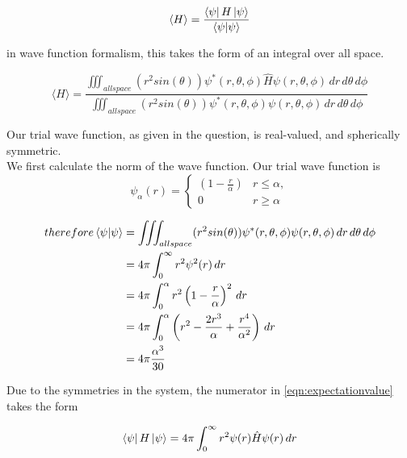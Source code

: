     \begin{equation*}
        \langle H \rangle = \frac{\bra{\psi}H\ket{\psi}}{\braket{\psi}{\psi}}
    \end{equation*}

    in wave function formalism, this takes the form of an integral over all
    space.

    \begin{equation}
        \label{eqn:expectationvalue}
        \langle H \rangle = \frac{\iiint_{all space} (r^{2}sin(\theta))\psi^{*}(r,\theta,\phi)\hat{H}\psi(r,\theta,\phi) \,dr\,d\theta\,d\phi}{\iiint_{all space} (r^{2}sin(\theta))\psi^{*}(r,\theta,\phi)\psi(r,\theta,\phi) \,dr\,d\theta\,d\phi}
    \end{equation}

    Our trial wave function, as given in the question, is real-valued, and
    spherically symmetric. \\
    We first calculate the norm of the wave function. Our trial wave function is
    \begin{equation*}
        \psi_{\alpha}(r) = 
        \begin{cases}
            \left( 1 - \frac{r}{\alpha}\right) & r \leqslant \alpha, \\
            0 & r \geqslant \alpha 
        \end{cases}
    \end{equation*}

    \begin{equation*}
    \begin{split}
        therefore \braket{\psi}{\psi} & = \iiint_{all space} (r^{2}sin(\theta))\psi^{*}(r,\theta,\phi)\psi(r,\theta,\phi) \,dr\,d\theta\,d\phi \\
        & = 4\pi \int_{0}^{\infty} r^{2} \psi^{2}(r)\,dr \\
        & = 4\pi \int_{0}^{\alpha} r^{2}\left( 1 - \frac{r}{\alpha}\right)^{2}\,dr \\
        & = 4\pi \int_{0}^{\alpha} \left( r^2 - \frac{2r^3}{\alpha} + \frac{r^4}{\alpha^2} \right)\,dr \\
        & = 4\pi \frac{\alpha^3}{30}
    \end{split}
    \end{equation*}
    
    Due to the symmetries in the system, the numerator in
    \ref{eqn:expectationvalue} takes the form

    \begin{equation*}
        \bra{\psi}H\ket{\psi} = 4\pi \int_{0}^{\infty} r^{2} \psi(r)\hat{H}\psi(r)\,dr
    \end{equation*}

